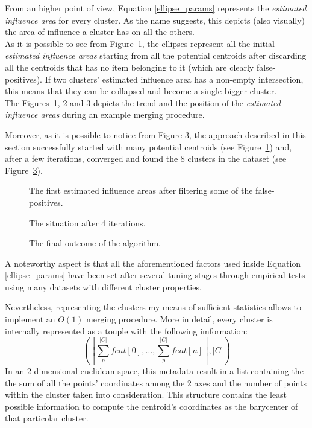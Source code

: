 From an higher point of view, Equation \ref{ellipse_params} represents the \emph{estimated influence area} 
for every cluster. As the name suggests, this depicts (also visually) the area of influence a cluster
has on all the others.\\
As it is possible to see from Figure~\ref{start}, the ellipses represent all the initial
\emph{estimated influence areas} starting from all the potential centroids after discarding
all the centroids that has no item belonging to it (which are clearly false-positives).
If two clusters' estimated influence area has a non-empty intersection, this
means that they can be collapsed and become a single bigger cluster.\\
The Figures~\ref{start}, \ref{middle} and \ref{end} depicts the trend and the position of the
\emph{estimated influence areas} during an example merging procedure.

Moreover, as it is possible to notice from Figure \ref{end}, the approach described in this
section successfully started with many potential centroids (see Figure~\ref{start}) and, after a
few iterations, converged and found the 8 clusters in the dataset (see Figure~\ref{end}). 

\begin{figure}[t]
  \caption{The first estimated influence areas after filtering some of the false-positives.}
  \label{start}
\end{figure}

\begin{figure}[t]
  \caption{The situation after 4 iterations.}
  \label{middle}
\end{figure}

\begin{figure}[t]
  \caption{The final outcome of the algorithm.}
  \label{end}
\end{figure}

A noteworthy aspect is that all the aforementioned factors used inside Equation \ref{ellipse_params} have
been set after several tuning stages through empirical tests using many datasets with different
cluster properties.

Nevertheless, representing the clusters my means of sufficient statistics allows to implement an $O(1)$
merging procedure. More in detail, every cluster is internally represented as a touple with the
following imformation:
\begin{equation*}
    \left(\left[\sum_{p}^{|C|} feat[0],\dots,\sum_{p}^{|C|} feat[n]\right],|C|\right)
\end{equation*}
In an 2-dimensional euclidean space, this metadata result in a list containing the the sum of all the
points' coordinates among the 2 axes and the number of points within the cluster taken into consideration.
This structure contains the least possible information to compute the centroid's coordinates as the
barycenter of that particolar cluster.  

